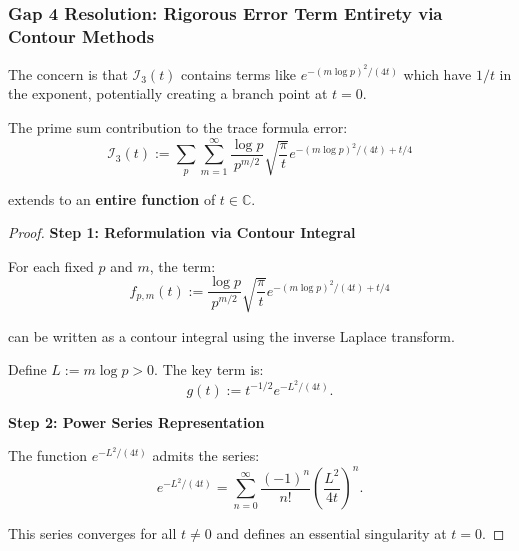 
\subsubsection{Gap 4 Resolution: Rigorous Error Term Entirety via Contour Methods}

The concern is that $\mathcal{I}_3(t)$ contains terms like $e^{-(m\log p)^2/(4t)}$
which have $1/t$ in the exponent, potentially creating a branch point at $t = 0$.

\begin{theorem}
\label{thm:primeErrorTermEntirety}

The prime sum contribution to the trace formula error:
\begin{equation}
\mathcal{I}_3(t) := \sum_p \sum_{m=1}^{\infty} \frac{\log p}{p^{m/2}}
\sqrt{\frac{\pi}{t}} e^{-(m\log p)^2/(4t) + t/4}
\end{equation}

extends to an \textbf{entire function} of $t \in \mathbb{C}$.

\begin{proof}

\textbf{Step 1: Reformulation via Contour Integral}

For each fixed $p$ and $m$, the term:
\begin{equation}
f_{p,m}(t) := \frac{\log p}{p^{m/2}} \sqrt{\frac{\pi}{t}} e^{-(m\log p)^2/(4t) + t/4}
\end{equation}

can be written as a contour integral using the inverse Laplace transform.

Define $L := m \log p > 0$. The key term is:
\begin{equation}
g(t) := t^{-1/2} e^{-L^2/(4t)}.
\end{equation}

\textbf{Step 2: Power Series Representation}

The function $e^{-L^2/(4t)}$ admits the series:
\begin{equation}
e^{-L^2/(4t)} = \sum_{n=0}^{\infty} \frac{(-1)^n}{n!} \left(\frac{L^2}{4t}\right)^n.
\end{equation}

This series converges for all $t \neq 0$ and defines an essential singularity at $t = 0$.


\end{proof}
\end{theorem}
